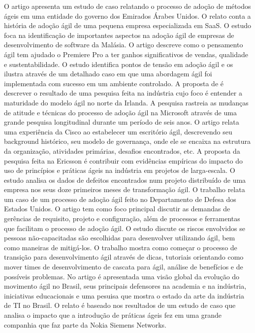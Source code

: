 O artigo \cite{Hajjdiab2011} apresenta um estudo de caso relatando o processo de adoção de métodos ágeis em uma entidade do governo dos Emirados Árabes Unidos. O relato \cite{Block2011} conta a história de adoção ágil de uma pequena empresa especializada em SaaS. O estudo \cite{Asnawi2012} foca na identificação de importantes aspectos na adoção ágil de empresas de desenvolvimento de software da Malásia. O artigo \cite{Adobe2012} descreve como o pensamento ágil tem ajudado o Premiere Pro a ter ganhos significativos de vendas, qualidade e sustentabilidade. O estudo \cite{Fitzgerald2013} identifica pontos de tensão em adoção ágil e os ilustra através de um detalhado caso em que uma abordagem ágil foi implementada com sucesso em um ambiente controlado. A proposta de \cite{Bustard2013} é descrever o resultado de uma pesquisa feita na indústria cujo foco é entender a maturidade do modelo ágil no norte da Irlanda. A pesquisa \cite{Microsoft2013} rastreia as mudanças de atitude e técnicas do processo de adoção ágil na Microsoft através de uma grande pesquisa longitudinal durante um período de seis anos. O artigo \cite{Cisco2011} relata uma experiência da Cisco ao estabelecer um escritório ágil, descrevendo seu background histórico, seu modelo de governança, onde ele se encaixa na estrutura da organização, atividades primárias, desafios encontrados, etc. A proposta da pesquisa \cite{Ericsson2013} feita na Ericsson é contribuir com evidências empíricas do impacto do uso de princípios e práticas ágeis na indústria em projetos de larga-escala. O estudo \cite{Korhonen2010} analisa os dados de defeitos encontrados num projeto distribuído de uma empresa nos seus doze primeiros meses de transformação ágil. O trabalho \cite{Lapham2012} relata um caso de um processo de adoção ágil feito no Departamento de Defesa dos Estados Unidos. O artigo \cite{Arikpo2011} tem como foco principal discutir as demandas de gerências de requisito, projeto e configuração, além de processos e ferramentas que facilitam o processo de adoção ágil. O estudo \cite{Radha2012} discute os riscos envolvidos se pessoas não-capacitadas são escolhidas para desenvolver utilizando ágil, bem como maneiras de mitigá-los. O trabalho \cite{Eunha2012} mostra como começar o processo de transição para desenvolvimento ágil através de dicas, tutoriais orientando como mover times de desenvolvimento de cascata para ágil, análise de benefícios e de possíveis problemas. No artigo \cite{Claudia2013} é apresentada uma visão global da evolução do movimento ágil no Brasil, seus principais defensores na academia e na indústria, iniciativas educacionais e uma pesuisa que mostra o estado da arte da indústria de TI no Brasil. O relato \cite{Nokia2013} é baseado nos resultados de um estudo de caso que analisa o impacto que a introdução de práticas ágeis fez em uma grande companhia que faz parte da Nokia Siemens Networks.

